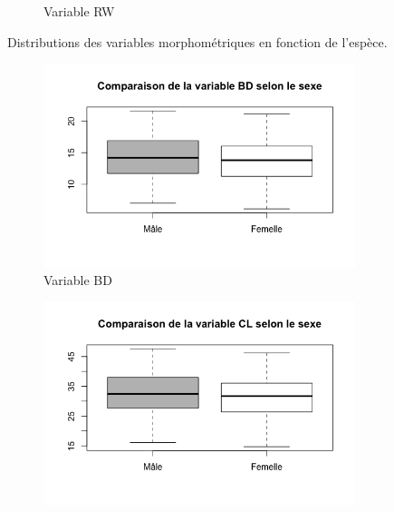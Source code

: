 \documentclass[a4paper,11pt]{report}
\begin{document}
\begin{figure}[H]
\begin{subfigure}[b]{0.3\linewidth}
		\caption{\scriptsize Variable RW}
		\label{fig:1_2_1_espece_rw}
	\end{subfigure}%
	\caption{
		\small Distributions des variables morphométriques en fonction de l'espèce.
	}
	\label{fig:morphemetriques_en_fonction_espece}%
\end{figure}%

\begin{figure}[H]
	\centering
	\captionsetup{justification=centering, margin=2cm}
	\begin{subfigure}[b]{0.3\linewidth}
		\centering
		\captionsetup{justification=centering, margin=1cm}
		\includegraphics[width=1\linewidth]{img/1-2-1-sex-bd.png}
		\caption{\scriptsize Variable BD}
		\label{fig:1_2_1_sex_bd}
	\end{subfigure}%
	\begin{subfigure}[b]{0.3\linewidth}
		\centering
		\captionsetup{justification=centering, margin=1cm}
		\includegraphics[width=1\linewidth]{img/1-2-1-sex-cl.png}

\end{subfigure}
\end{figure}
\end{document}
